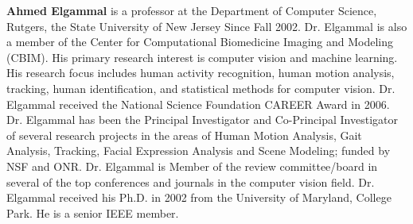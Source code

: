  \textbf{Ahmed Elgammal} is a professor at the Department of Computer Science, Rutgers, the State University of New Jersey Since Fall 2002. Dr. Elgammal is also a member of the Center for Computational Biomedicine Imaging and Modeling (CBIM). His primary research interest is computer vision and machine learning. His research focus includes human activity recognition, human motion analysis, tracking, human identification, and statistical methods for computer vision. Dr. Elgammal received the National Science Foundation CAREER Award in 2006. Dr. Elgammal has been the Principal Investigator and Co-Principal Investigator of several research projects in the areas of Human Motion Analysis, Gait Analysis, Tracking, Facial Expression Analysis and Scene Modeling; funded by NSF and ONR. Dr. Elgammal is Member of the review committee/board in several of the top conferences and journals in the computer vision field. Dr. Elgammal received his Ph.D. in 2002 from the University of Maryland, College Park. He is a senior IEEE member. 

